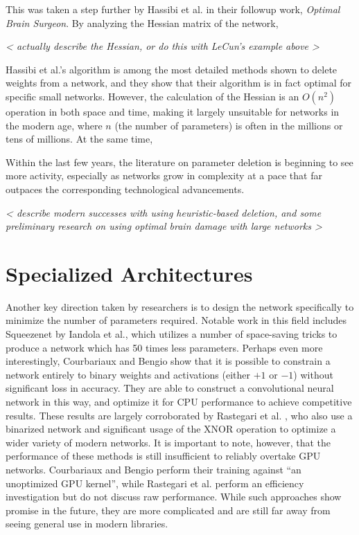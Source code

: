 This was taken a step further by Hassibi et al. \cite{hassibi1993second} in their followup work, \emph{Optimal Brain Surgeon}.
By analyzing the Hessian matrix of the network, 

\emph{ < actually describe the Hessian, or do this with LeCun's example above > }

Hassibi et al.'s algorithm is among the most detailed methods shown to delete weights from a network, and they show that their algorithm is in fact optimal for specific small networks.
However, the calculation of the Hessian is an $O(n^2)$ operation in both space and time, making it largely unsuitable for networks in the modern age, where $n$ (the number of parameters) is often in the millions or tens of millions.
At the same time,

Within the last few years, the literature on parameter deletion is beginning to see more activity, especially as networks grow in complexity at a pace that far outpaces the corresponding technological advancements.

\emph{ < describe modern successes with using heuristic-based deletion, and some preliminary research on using optimal brain damage with large networks > }

\section{Specialized Architectures}
Another key direction taken by researchers is to design the network specifically to minimize the number of parameters required.
Notable work in this field includes Squeezenet \cite{iandola2016squeezenet} by Iandola et al., which utilizes a number of space-saving tricks to produce a network which has 50 times less parameters.
Perhaps even more interestingly, Courbariaux and Bengio show that it is possible to constrain a network entirely to binary weights and activations (either $+1$ or $-1$) without significant loss in accuracy.
They are able to construct a convolutional neural network in this way, and optimize it for CPU performance to achieve competitive results.
These results are largely corroborated by Rastegari et al. \cite{rastegari2016xnor}, who also use a binarized network and significant usage of the XNOR operation to optimize a wider variety of modern networks.
It is important to note, however, that the performance of these methods is still insufficient to reliably overtake GPU networks.
Courbariaux and Bengio perform their training against ``an unoptimized GPU kernel'', while Rastegari et al. perform an efficiency investigation but do not discuss raw performance.
While such approaches show promise in the future, they are more complicated and are still far away from seeing general use in modern libraries.

